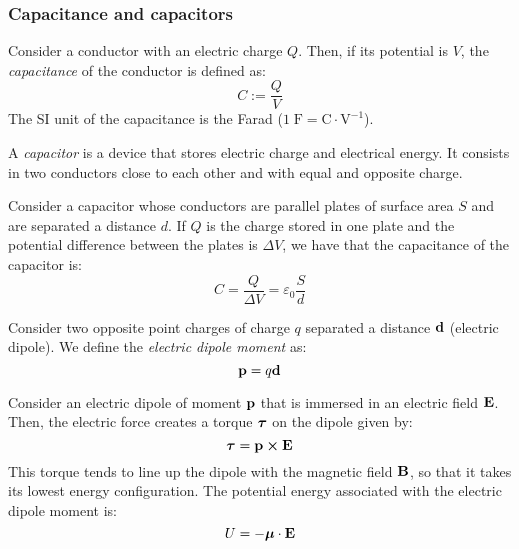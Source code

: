 \documentclass[../../../main.tex]{subfiles}
\begin{document}
\begin{multicols}{2}
  \subsubsection{Capacitance and capacitors}
  \begin{definition}[Capacitance]
    Consider a conductor with an electric charge $Q$. Then, if its potential is $V$, the \textit{capacitance} of the conductor is defined as: $$C:=\frac{Q}{V}$$
    The SI unit of the capacitance is the Farad ($1\;\text{F}=\text{C}\cdot\text{V}^{-1}$).
  \end{definition}
  \begin{definition}[Capacitor]
    A \textit{capacitor} is a device that stores electric charge and electrical energy. It consists in two conductors close to each other and with equal and opposite charge.
  \end{definition}
  \begin{prop}
    Consider a capacitor whose conductors are parallel plates of surface area $S$ and are separated a distance $d$. If $Q$ is the charge stored in one plate and the  potential difference between the plates is $\Delta V$, we have that the capacitance of the capacitor is: $$C=\frac{Q}{\Delta V}=\varepsilon_0\frac{S}{d}$$
  \end{prop}
  \begin{definition}
    Consider two opposite point charges of charge $q$ separated a distance $\boldsymbol{\mathrm{d}}$ (electric dipole). We define the \textit{electric dipole moment} as: $$\boldsymbol{\mathrm{p}}=q\boldsymbol{\mathrm{d}}$$
  \end{definition}
  \begin{prop}
    Consider an electric dipole of moment $\boldsymbol{\mathrm{p}}$ that is immersed in an electric field $\boldsymbol{\mathrm{E}}$. Then, the electric force creates a torque $\boldsymbol{\mathrm{\tau}}$ on the dipole given by: $$\vectorfunction{\tau}=\vectorfunction{p}\crossprod\vectorfunction{E}$$ This torque tends to line up the dipole with the magnetic field $\boldsymbol{\mathrm{B}}$, so that it takes its lowest energy configuration. The potential energy associated with the electric dipole moment is: $$U=-\boldsymbol{\mathrm{\mu}}\cdot\boldsymbol{\mathrm{E}}$$
  \end{prop}
  \begin{center}
    \begin{minipage}{\linewidth}
      \centering
      
    \end{minipage}

\end{center}
\end{multicols}
\end{document}

